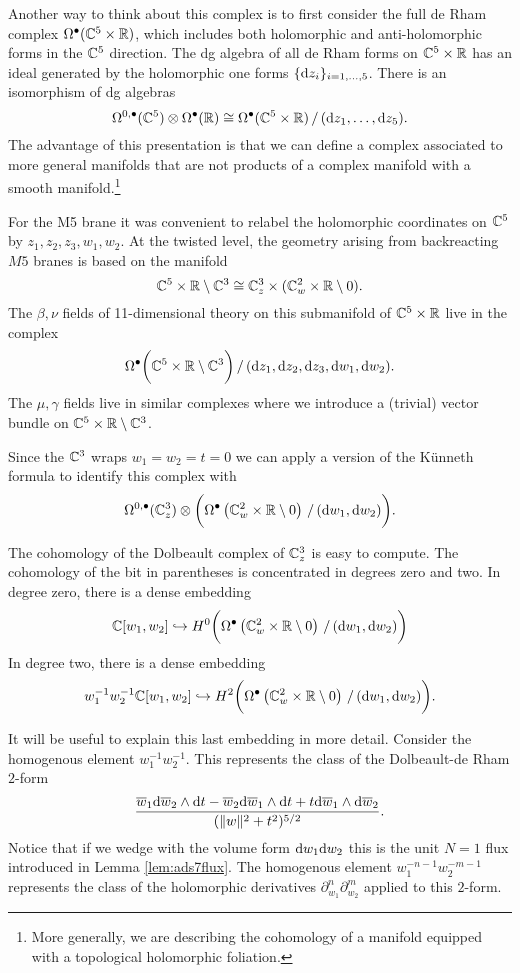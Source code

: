 Another way to think about this complex is to first consider the full de Rham complex $\Omega^\bullet(\mathbb C^5 \times \mathbb R)$, which includes both holomorphic and anti-holomorphic forms in the $\mathbb C^5$ direction. 
The dg algebra of all de Rham forms on $\mathbb C^5 \times \mathbb R$ has an ideal generated by the holomorphic one forms $\{{\rm d} z_i\}_{i=1,\ldots,5}$.
There is an isomorphism of dg algebras
\[
\Omega^{0,\bullet}(\mathbb C^5) \otimes \Omega^\bullet(\mathbb R) \cong \Omega^\bullet(\mathbb C^5 \times \mathbb R) \, / \, ({\rm d} z_1,\ldots, {\rm d} z_5) .
\]
The advantage of this presentation is that we can define a complex associated to more general manifolds that are not products of a complex manifold with a smooth manifold.\footnote{More generally, we are describing the cohomology of a manifold equipped with a topological holomorphic foliation.}

For the M5 brane it was convenient to relabel the holomorphic coordinates on $\mathbb C^5$ by $z_1,z_2,z_3,w_1,w_2$. 
At the twisted level, the geometry arising from backreacting $M5$ branes is based on the manifold 
\[
\mathbb C^5 \times \mathbb R \setminus \mathbb C^3 \cong \mathbb C_z^3 \times (\mathbb C^2_w \times \mathbb R \setminus 0) .
\]
The $\beta,\nu$ fields of 11-dimensional theory on this submanifold of $\mathbb C^5 \times \mathbb R$ live in the complex 
\[
\Omega^\bullet\bigg(\mathbb C^5 \times \mathbb R \setminus \mathbb C^3\bigg) \, / \, ({\rm d} z_1,{\rm d} z_2,{\rm d} z_3, {\rm d} w_1, {\rm d} w_2)  .
\]
The $\mu,\gamma$ fields live in similar complexes where we introduce a (trivial) vector bundle on $\mathbb C^5 \times \mathbb R \setminus \mathbb C^3$. 

Since the $\mathbb C^3$ wraps $w_1=w_2=t=0$ we can apply a version of the K\"unneth formula to identify this complex with 
\[
\Omega^{0,\bullet}(\mathbb C^3_z) \otimes \bigg( \Omega^\bullet\left(\mathbb C^2_w \times \mathbb R \setminus 0 \right) \, / \, ({\rm d} w_1, {\rm d} w_2) \bigg).
\]

The cohomology of the Dolbeault complex of $\mathbb C^3_z$ is easy to compute. 
The cohomology of the bit in parentheses is concentrated in degrees zero and two. 
In degree zero, there is a dense embedding
\[
\mathbb C[w_1,w_2] \hookrightarrow H^0 \bigg( \Omega^\bullet\left(\mathbb C^2_w \times \mathbb R \setminus 0 \right) \, / \, ({\rm d} w_1, {\rm d} w_2) \bigg)
\]
In degree two, there is a dense embedding
\[
w_{1}^{-1} w_2^{-1} \mathbb C[w_1,w_2] \hookrightarrow H^2 \bigg( \Omega^\bullet\left(\mathbb C^2_w \times \mathbb R \setminus 0 \right) \, / \, ({\rm d} w_1, {\rm d} w_2) \bigg).
\]

It will be useful to explain this last embedding in more detail. 
Consider the homogenous element $w_1^{-1} w_2^{-1}$. 
This represents the class of the Dolbeault-de Rham $2$-form
\[
\frac{\overline{w}_1 {\rm d} \overline{w}_2 \wedge {\rm d} t - \overline{w}_2 {\rm d} \overline{w}_1 \wedge {\rm d} t + t {\rm d} \overline{w}_1 \wedge {\rm d} \overline{w}_2}{(\|w\|^2 + t^2)^{5/2}} .
\]
Notice that if we wedge with the volume form ${\rm d} w_1 {\rm d} w_2$ this is the unit $N=1$ flux introduced in Lemma \ref{lem:ads7flux}. 
The homogenous element $w_1^{-n-1} w_2^{-m-1}$ represents the class of the holomorphic derivatives $\partial_{w_1}^n \partial_{w_2}^{m}$ applied to this $2$-form. 

